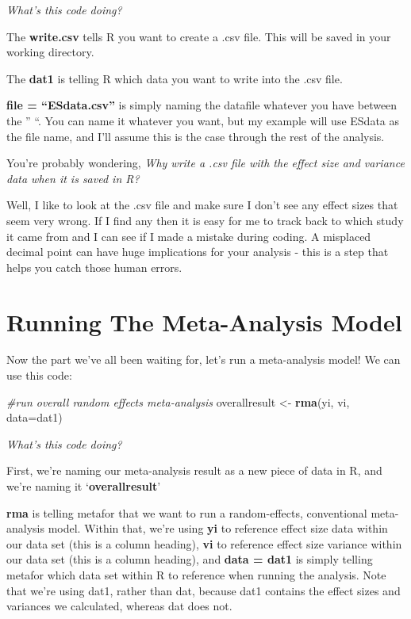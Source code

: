 \documentclass[
]{book}
\newenvironment{Shaded}{\begin{snugshade}}{\end{snugshade}}
\newcommand{\AttributeTok}[1]{\textcolor[rgb]{0.13,0.29,0.53}{#1}}
\newcommand{\CommentTok}[1]{\textcolor[rgb]{0.56,0.35,0.01}{\textit{#1}}}
\newcommand{\FunctionTok}[1]{\textcolor[rgb]{0.13,0.29,0.53}{\textbf{#1}}}
\newcommand{\NormalTok}[1]{#1}
\newcommand{\OtherTok}[1]{\textcolor[rgb]{0.56,0.35,0.01}{#1}}
\begin{document}
\emph{What's this code doing?}

The \textbf{write.csv} tells R you want to create a .csv file. This will be saved in your working directory.

The \textbf{dat1} is telling R which data you want to write into the .csv file.

\textbf{file = ``ESdata.csv''} is simply naming the datafile whatever you have between the '' ``. You can name it whatever you want, but my example will use ESdata as the file name, and I'll assume this is the case through the rest of the analysis.

You're probably wondering, \emph{Why write a .csv file with the effect size and variance data when it is saved in R?}

Well, I like to look at the .csv file and make sure I don't see any effect sizes that seem very wrong. If I find any then it is easy for me to track back to which study it came from and I can see if I made a mistake during coding. A misplaced decimal point can have huge implications for your analysis - this is a step that helps you catch those human errors.

\hypertarget{running-the-meta-analysis-model}{%
\section{Running The Meta-Analysis Model}\label{running-the-meta-analysis-model}}

Now the part we've all been waiting for, let's run a meta-analysis model! We can use this code:

\begin{Shaded}
\begin{Highlighting}[]
\CommentTok{\#run overall random effects meta{-}analysis}
\NormalTok{overallresult }\OtherTok{\textless{}{-}} \FunctionTok{rma}\NormalTok{(yi, vi, }\AttributeTok{data=}\NormalTok{dat1)}
\end{Highlighting}
\end{Shaded}

\emph{What's this code doing?}

First, we're naming our meta-analysis result as a new piece of data in R, and we're naming it `\textbf{overallresult}'

\textbf{rma} is telling metafor that we want to run a random-effects, conventional meta-analysis model. Within that, we're using \textbf{yi} to reference effect size data within our data set (this is a column heading), \textbf{vi} to reference effect size variance within our data set (this is a column heading), and \textbf{data = dat1} is simply telling metafor which data set within R to reference when running the analysis. Note that we're using dat1, rather than dat, because dat1 contains the effect sizes and variances we calculated, whereas dat does not.
\end{document}
